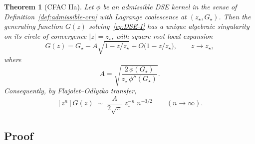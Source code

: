 \documentclass[11pt,a4paper]{article}
\theoremstyle{plain}
\newtheorem{theorem}{Theorem}
\theoremstyle{definition}
\begin{document}
\begin{thmbox}
\begin{theorem}[CFAC IIa]
\label{thm:IIa}
Let $\phi$ be an admissible DSE kernel in the sense of
Definition~\ref{def:admissible-crn} with Lagrange coalescence at
$(z_\star, G_\star)$.  Then the generating function $G(z)$
solving~\eqref{eq:DSE-I} has a unique algebraic singularity on its
circle of convergence $|z| = z_\star$, with square-root local
expansion
\begin{equation}
\label{eq:IIa-expansion}
  G(z) = G_\star - A \sqrt{1 - z/z_\star} + O\!\bigl(1 - z/z_\star\bigr),
  \qquad z \to z_\star,
\end{equation}
where
\begin{equation}
\label{eq:IIa-A}
  A = \sqrt{\frac{2\,\phi(G_\star)}{z_\star\,\phi''(G_\star)}}.
\end{equation}
Consequently, by Flajolet--Odlyzko transfer,
\begin{equation}
\label{eq:IIa-asymptotic}
  [z^n] G(z) \;\sim\; \frac{A}{2\sqrt{\pi}}\; z_\star^{-n}\; n^{-3/2}
  \qquad (n \to \infty).
\end{equation}
\end{theorem}
\end{thmbox}

\subsection{Proof}
\end{document}
